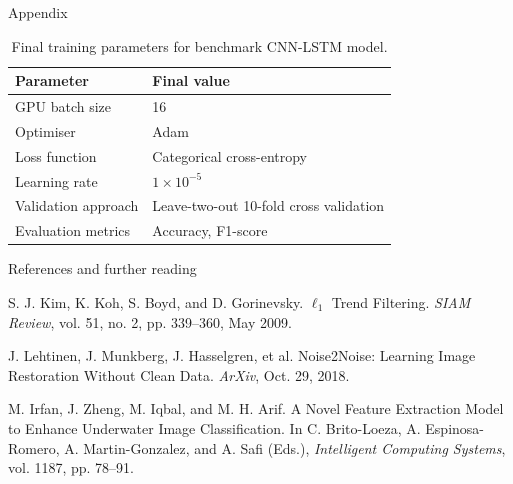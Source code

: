 \documentclass[]{beamer}
\begin{document}


\begin{frame}{Appendix}
    \small
    \captionsetup{font=small}
    \begin{table}
        \centering
        \caption{Final training parameters for benchmark CNN-LSTM model.}
        \begin{tabular}{ll}
        \toprule
        \textbf{Parameter} & \textbf{Final value} \\ \midrule
        GPU batch size & 16 \\
        Optimiser & Adam \\
        Loss function & Categorical cross-entropy \\
        Learning rate & $1 \times 10^{-5}$ \\
        Validation approach & Leave-two-out 10-fold cross validation \\
        Evaluation metrics & Accuracy, F1-score \\ \bottomrule
        \end{tabular}
    \end{table}
\end{frame}


\begin{frame}{References and further reading}
    \small
    \begin{thebibliography}{99} 
        S. J. Kim, K. Koh, S. Boyd, and D. Gorinevsky.
        \newblock $\ell_1$ Trend Filtering.
        \newblock \emph{SIAM Review}, vol. 51, no. 2, pp. 339–360, May 2009.

        J. Lehtinen, J. Munkberg, J. Hasselgren, et al.
        \newblock Noise2Noise: Learning Image Restoration Without Clean Data.
        \newblock \emph{ArXiv}, Oct. 29, 2018.

        M. Irfan, J. Zheng, M. Iqbal, and M. H. Arif.
        \newblock A Novel Feature Extraction Model to Enhance Underwater Image Classification.
        \newblock In C. Brito-Loeza, A. Espinosa-Romero, A. Martin-Gonzalez, and A. Safi (Eds.), \emph{Intelligent Computing Systems}, vol. 1187, pp. 78–91.

    \end{thebibliography}
\end{frame}
\end{document}
